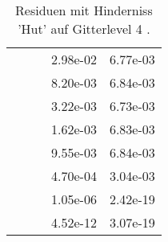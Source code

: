 \begin{table}
\begin{tabular}{c|cc|cc|}
\multicolumn{1}{|c|}{} & \multicolumn{1}{|c|}{} & \multicolumn{1}{|c|}{} & \multicolumn{1}{|c|}{  2.98e-02} & \multicolumn{1}{|c|}{  6.77e-03} \\ 
\multicolumn{1}{|c|}{} & \multicolumn{1}{|c|}{} & \multicolumn{1}{|c|}{} & \multicolumn{1}{|c|}{  8.20e-03} & \multicolumn{1}{|c|}{  6.84e-03} \\ 
\multicolumn{1}{|c|}{} & \multicolumn{1}{|c|}{} & \multicolumn{1}{|c|}{} & \multicolumn{1}{|c|}{  3.22e-03} & \multicolumn{1}{|c|}{  6.73e-03} \\ 
\multicolumn{1}{|c|}{} & \multicolumn{1}{|c|}{} & \multicolumn{1}{|c|}{} & \multicolumn{1}{|c|}{  1.62e-03} & \multicolumn{1}{|c|}{  6.83e-03} \\ 
\multicolumn{1}{|c|}{} & \multicolumn{1}{|c|}{} & \multicolumn{1}{|c|}{} & \multicolumn{1}{|c|}{  9.55e-03} & \multicolumn{1}{|c|}{  6.84e-03} \\ 
\multicolumn{1}{|c|}{} & \multicolumn{1}{|c|}{} & \multicolumn{1}{|c|}{} & \multicolumn{1}{|c|}{  4.70e-04} & \multicolumn{1}{|c|}{  3.04e-03} \\ 
\multicolumn{1}{|c|}{} & \multicolumn{1}{|c|}{} & \multicolumn{1}{|c|}{} & \multicolumn{1}{|c|}{  1.05e-06} & \multicolumn{1}{|c|}{  2.42e-19} \\ 
\multicolumn{1}{|c|}{} & \multicolumn{1}{|c|}{} & \multicolumn{1}{|c|}{} & \multicolumn{1}{|c|}{  4.52e-12} & \multicolumn{1}{|c|}{  3.07e-19} \\ 
\hline 
\end{tabular}\caption{Residuen mit Hinderniss 'Hut' auf Gitterlevel 4 .}\label{tab:Residuum_Hut_level4}
\end{table} 

